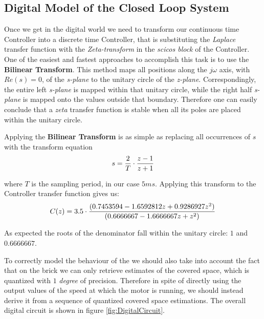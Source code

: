 \subsection{Digital Model of the Closed Loop System}

Once we get in the digital world we need to transform our continuous time Controller into a discrete time Controller, that is substituting the \textit{Laplace} transfer function with the \textit{Zeta-transform} in the \textit{scicos block} of the Controller. One of the easiest and fastest approaches to accomplish this task is to use the \textbf{Bilinear Transform}. This method maps all positions along the $j\omega$ axis, with $Re(s)=0$, of the \textit{s-plane} to the unitary circle of the \textit{z-plane}. Correspondingly, the entire left \textit{s-plane} is mapped within that unitary circle, while the right half \textit{s-plane} is mapped onto the values outside that boundary. Therefore one can easily conclude that a \textit{zeta} transfer function is stable when all its poles are placed within the unitary circle.

Applying the \textbf{Bilinear Transform} is as simple as replacing all occurrences of $s$ with the transform equation
\[
s = {2 \over T}\cdot{}{z-1 \over z+1}
\]

where $T$ is the sampling period, in our case $5 ms$. Applying this transform to the Controller transfer function gives us:
\[
C(z) = 3.5 \cdot{} {(0.7453594 - 1.6592812z + 0.9286927z^2) \over (0.6666667 -1.6666667z + z^2)}
\]

As expected the roots of the denominator fall within the unitary circle: $1$ and $0.6666667$.

To correctly model the behaviour of the \LEGOMOTOR{} we should also take into account the fact that on the brick we can only retrieve estimates of the covered space, which is quantized with $1$ \textit{degree} of precision. Therefore in spite of directly using the output values of the speed at which the motor is running, we should instead derive it from a sequence of quantized covered space estimations. The overall digital circuit is shown in figure \ref{fig:DigitalCircuit}.

